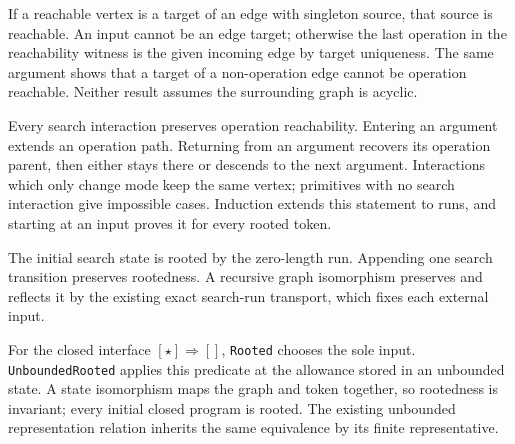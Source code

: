

If a reachable vertex is a target of an edge with singleton source, that
source is reachable. An input cannot be an edge target; otherwise the last
operation in the reachability witness is the given incoming edge by target
uniqueness. The same argument shows that a target of a non-operation edge
cannot be operation reachable. Neither result assumes the surrounding graph
is acyclic.



Every search interaction preserves operation reachability. Entering an
argument extends an operation path. Returning from an argument recovers its
operation parent, then either stays there or descends to the next argument.
Interactions which only change mode keep the same vertex; primitives with no
search interaction give impossible cases. Induction extends this statement
to runs, and starting at an input proves it for every rooted token.




The initial search state is rooted by the zero-length run. Appending one
search transition preserves rootedness. A recursive graph isomorphism preserves
and reflects it by the existing exact search-run transport, which fixes each
external input.




For the closed interface $[\star]\Rightarrow[]$, \texttt{Rooted} chooses the
sole input. \texttt{UnboundedRooted} applies this predicate at the allowance
stored in an unbounded state. A state isomorphism maps the graph and token
together, so rootedness is invariant; every initial closed program is rooted.
The existing unbounded representation relation inherits the same equivalence
by its finite representative.


